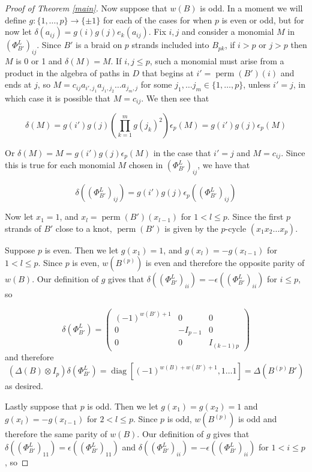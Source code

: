 \documentclass[11pt]{amsart}
\def\ltblue{blue!20!white}
\newcommand\diag{\operatorname{diag}}
\newcommand\perm{\operatorname{perm}}
\begin{document}
\begin{proof}[Proof of Theorem \ref{main}]
Now suppose that $w(B)$ is odd.  In a moment we will define $g\colon \{1,\ldots,p\}\rightarrow \{\pm 1\}$ for each of the cases for when $p$ is even or odd, but for now let $\delta(a_{ij}) = g(i)g(j)e_k(a_{ij})$.  Fix $i,j$ and consider a monomial $M$ in $\left(\Phi_{B'}^L\right)_{ij}$.  Since $B'$ is a braid on $p$ strands included into $B_{pk}$, if $i>p$ or $j>p$ then $M$ is 0 or 1 and $\delta(M) = M$.  If $i,j\le p$, such a monomial must arise from a product in the algebra of paths in $D$ \todo[color=\ltblue]{just introducing this notation} that begins at $i' = \perm(B')(i)$ and ends at $j$, so $M=c_{ij}a_{i',j_1}a_{j_1,j_2}\ldots a_{j_m,j}$ for some $j_1,\ldots j_m\in \{1,\ldots,p\}$, unless $i' = j$, in which case it is possible that $M=c_{ij}$.  We then see that 

$$\delta(M) = g(i')g(j)\left(\prod_{k=1}^m g(j_k)^2\right)\epsilon_p(M) = g(i')g(j)\epsilon_p(M)$$

\noindent Or $\delta(M) = M = g(i')g(j)\epsilon_p(M)$ in the case that $i'=j$ and $M=c_{ij}$.  Since this is true for each monomial $M$ chosen in $\left(\Phi_{B'}^L\right)_{ij}$, we have that

$$\delta\left(\left(\Phi_{B'}^L\right)_{ij}\right) = g(i')g(j)\epsilon_p\left(\left(\Phi_{B'}^L\right)_{ij}\right)$$

Now let $x_1 = 1$, and $x_l = \perm(B')(x_{l-1})$ for $1<l\le p$.  Since the first $p$ strands of $B'$ close to a knot, $\perm(B')$ is given by the $p$-cycle $(x_1x_2\ldots x_p)$.

Suppose $p$ is even.  Then we let $g(x_1) = 1$, and $g(x_l) = -g(x_{l-1})$ for $1<l\le p$.  Since $p$ is even, $w(B^{(p)})$ is even and therefore the opposite parity of $w(B)$.  Our definition of $g$ gives that $\delta\left(\left(\Phi_{B'}^L\right)_{ii}\right) = -\epsilon\left(\left(\Phi_{B'}^L\right)_{ii}\right)$ for $i\le p$, so 

$$\delta\left(\Phi_{B'}^L\right) = 
\left( \begin{array}{ccc}
(-1)^{w(B')+1} & 0 & 0 \\
0 & -I_{p-1} & 0 \\
0 & 0 & I_{(k-1)p} \end{array} \right)
$$
\noindent and therefore
$$
\left(\Delta(B)\otimes I_p\right)\delta\left(\Phi_{B'}^L\right) = \diag[(-1)^{w(B) + w(B') + 1},1\ldots 1] = \Delta(B^{(p)}B')
$$
\noindent as desired.

Lastly suppose that $p$ is odd.  Then we let $g(x_1) = g(x_2) = 1$ and $g(x_l) = -g(x_{l-1})$ for $2<l\le p$.  Since $p$ is odd, $w(B^{(p)})$ is odd and therefore the same parity of $w(B)$.  Our definition of $g$ gives that $\delta\left(\left(\Phi_{B'}^L\right)_{11}\right) = \epsilon\left(\left(\Phi_{B'}^L\right)_{11}\right)$ and $\delta\left(\left(\Phi_{B'}^L\right)_{ii}\right) = -\epsilon\left(\left(\Phi_{B'}^L\right)_{ii}\right)$ for $1<i\le p$, so 


\end{proof}
\end{document}

